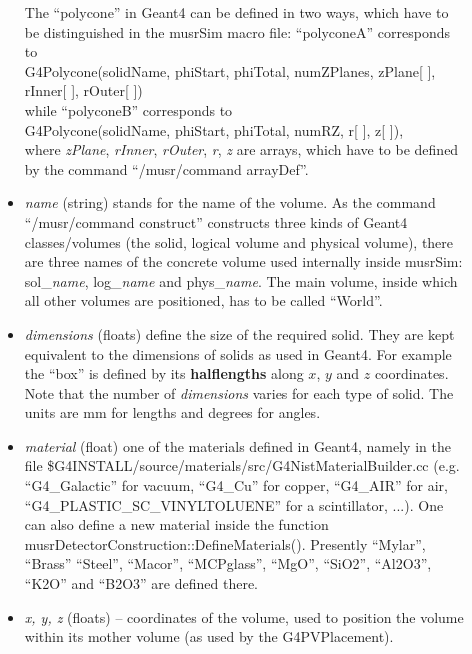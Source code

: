 \documentclass[twoside]{dis04}
\begin{document}
\begin{description}
\begin{itemize}
		     The ``polycone'' in Geant4 can be defined in two ways, which have to be 
		     distinguished in the musrSim macro file:
		     ``polyconeA'' corresponds to \\
		     G4Polycone(solidName, phiStart, phiTotal, numZPlanes, zPlane[ ], rInner[ ], rOuter[ ])\\
		     while  ``polyconeB'' corresponds to \\
		     G4Polycone(solidName, phiStart, phiTotal, numRZ, r[ ], z[ ]),\\
		     where \emph{zPlane}, \emph{rInner}, \emph{rOuter}, \emph{r}, \emph{z} are arrays, which
		     have to be defined by the command ``/musr/command arrayDef''.
	\item \emph{name} (string) stands for the name of the volume.  As the command 
		     ``/musr/command construct'' constructs
	             three kinds of Geant4 classes/volumes (the solid, logical volume and physical 
	             volume), there are three names of the concrete volume used internally inside 
                     musrSim: sol\_\emph{name}, log\_\emph{name} and phys\_\emph{name}.
	              The main volume, inside which all other volumes are positioned, has to be called  ``World''.
	\item \emph{dimensions} (floats) define the size of the required solid.  They are kept equivalent to the
	             dimensions of solids as used in {\sc Geant4}.  For example the ``box'' is defined
	             by its {\bf halflengths} along $x$, $y$ and $z$ coordinates.  Note that the number of
	             \emph{dimensions} varies for each type of solid.  The units are mm for lengths
		     and degrees for angles.
	\item \emph{material} (float) one of the materials defined in {\sc Geant4}, namely in the file 
	             \$G4INSTALL/source/materials/src/G4NistMaterialBuilder.cc (e.g. ``G4\_Galactic'' for
	             vacuum, ``G4\_Cu'' for copper, ``G4\_AIR'' for air, 
                     ``G4\_PLASTIC\_SC\_VINYLTOLUENE'' for a scintillator, ...).
	             One can also define a new material inside the function 
                     musrDetectorConstruction::DefineMaterials().  Presently ``Mylar'', ``Brass'' 
                     ``Steel'', ``Macor'', ``MCPglass'', ``MgO'', ``SiO2'', ``Al2O3'', ``K2O'' and ``B2O3'' are defined there.
	\item \emph{x, y, z} (floats) -- coordinates of the volume, used to position the volume within
                     its mother volume (as used by the G4PVPlacement).  

\end{itemize}
\end{description}
\end{document}
